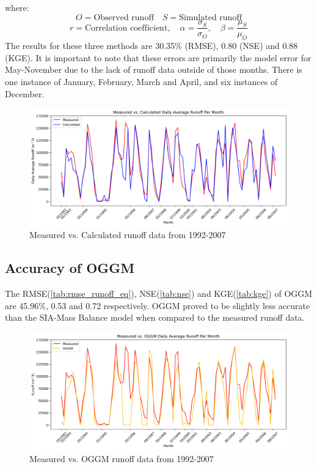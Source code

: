 \documentclass{article}
\begin{document}
\noindent where:
$$O = \text{Observed runoff} \quad S=\text{Simulated runoff}$$
$$r = \mbox{Correlation coefficient}, \quad \alpha = \frac{\sigma_S}{\sigma_O}, \quad \beta = \frac{\mu_S}{\mu_O}$$
The results for these three methods are 30.35\% (RMSE), 0.80 (NSE) and 0.88 (KGE). It is important to note that these errors are primarily the model error for 
May-November due to the lack of runoff data outside of those months. There is one instance of January, February, March and April, and six 
instances of December. 
\begin{figure}[h!]
    \centering
    \includegraphics[width=\textwidth]{Plots/calc_vs_measured.png}
    \caption{Measured vs. Calculated runoff data from 1992-2007}
    \label{fig:calc_vs_measured}
\end{figure}
\FloatBarrier
\subsection{Accuracy of OGGM}
The RMSE(\ref{tab:rmse_runoff_eq}), NSE(\ref{tab:nse}) and KGE(\ref{tab:kge}) of OGGM are 45.96\%, 0.53 and 0.72 respectively. OGGM proved to be slightly less accurate than the SIA-Mass Balance model when 
compared to the measured runoff data. 
\begin{figure}[h!]
    \centering
    \includegraphics[width=\textwidth]{Plots/oggm_vs_measured.png}
    \caption{Measured vs. OGGM runoff data from 1992-2007}
    \label{fig:oggm_vs_measured}
\end{figure}
\FloatBarrier
\end{document}
